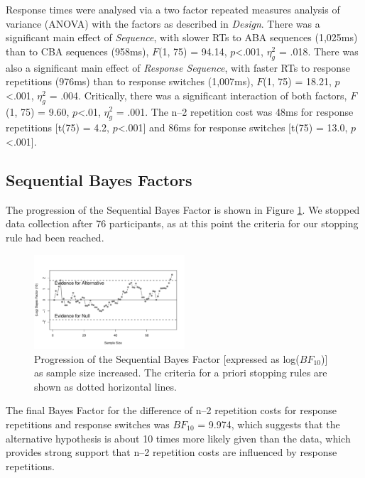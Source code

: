 \documentclass[a4paper, jou, natbib]{apa6}
\begin{document}
Response times were analysed via a two factor repeated measures analysis of variance (ANOVA) with the factors as described in \emph{Design}. There was a significant main effect of \emph{Sequence}, with slower RTs to ABA sequences (1,025ms) than to CBA sequences (958ms), $F$(1, 75) = 94.14, $p$<.001, $\eta_g^2$ = .018.  There was also a significant main effect of \emph{Response Sequence}, with faster RTs to response repetitions (976ms) than to response switches (1,007ms), $F$(1, 75) = 18.21, $p$<.001, $\eta_g^2$ = .004.  Critically, there was a significant interaction of both factors, $F$(1, 75) = 9.60, $p$<.01, $\eta_g^2$ = .001. The n--2 repetition cost was 48ms for response repetitions [t(75) = 4.2, $p$<.001] and 86ms for response switches [t(75) = 13.0, $p$<.001].

\subsection{Sequential Bayes Factors}
The progression of the Sequential Bayes Factor is shown in Figure \ref{fig:bayesFactor}. We stopped data collection after 76 participants, as at this point the criteria for our stopping rule had been reached. 

\begin{figure}
\begin{center}
\includegraphics[width = 0.5\textwidth]{Images/bayesFactor.pdf}
\caption{Progression of the Sequential Bayes Factor [expressed as log($BF_{10}$)] as sample size increased. The criteria for a priori stopping rules are shown as dotted horizontal lines.}
\label{fig:bayesFactor}
\end{center}
\end{figure}

The final Bayes Factor for the difference of n--2 repetition costs for response repetitions and response switches was $BF_{10}$ = 9.974, which suggests that the alternative hypothesis is about 10 times more likely given than the data, which provides strong support that n--2 repetition costs are influenced by response repetitions.
\end{document}
